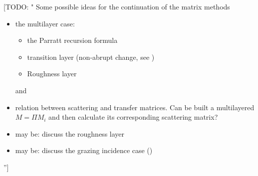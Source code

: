 \documentclass[preprint]{iucr}              %
\newcommand{\todo}[1]{{\color{red}[TODO: "#1'']}}
\begin{document}
\todo{ Some possible ideas for the continuation of the matrix methods
\begin{itemize}
    \item the multilayer case:
    \begin{itemize}
        \item the Parratt recursion formula
        \item transition layer (non-abrupt change, see \cite{Lobach})
        \item Roughness layer
    \end{itemize}and 
    \item relation between scattering and transfer matrices. Can be built a multilayered $M=\Pi M_i$ and then calculate its corresponding scattering matrix?
    \item may be: discuss the roughness layer
    \item may be: discuss the grazing incidence case (\cite{Yashiro2001, Stepanov1998})
\end{itemize}
}








\end{document}
